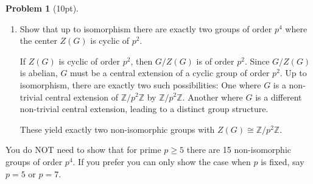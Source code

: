 \documentclass[12pt]{article}
\theoremstyle{definition}
\newtheorem{problem}{Problem}
\begin{document}
\begin{problem}[10pt]
\begin{enumerate}[label=\arabic*.]
        \item Show that up to isomorphism there are exactly two groups of order $p^4$ where
              the center $Z(G)$ is cyclic of $p^2$.

        \begin{solution}
            If $Z(G)$ is cyclic of order $p^2$, then $G/Z(G)$ is of order $p^2$. Since $G/Z(G)$ is abelian, $G$ must be a central extension of a cyclic group of order $p^2$. Up to isomorphism, there are exactly two such possibilities:
            One where $G$ is a non-trivial central extension of $\mathbb{Z}/p^2\mathbb{Z}$ by $\mathbb{Z}/p^2\mathbb{Z}$. Another where $G$ is a different non-trivial central extension, leading to a distinct group structure.
            
            These yield exactly two non-isomorphic groups with $Z(G) \cong \mathbb{Z}/p^2\mathbb{Z}$.
        \end{solution}
    \end{enumerate}
    You do NOT need to show that for prime $p \geq 5$ there are 15 non-isomorphic groups of order $p^4$.
    If you prefer you can only show the case when $p$ is fixed, say $p = 5$ or $p = 7$.
\end{problem}
\end{document}

